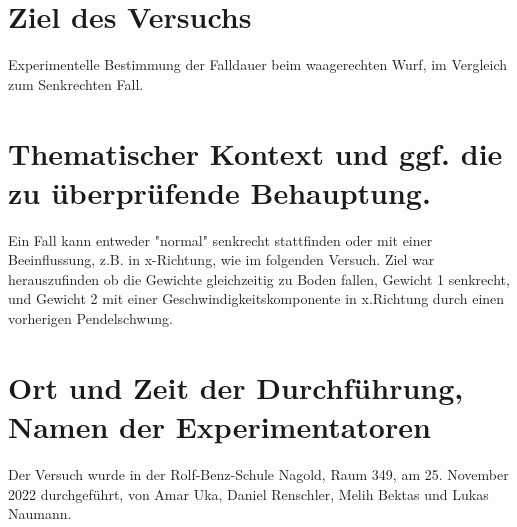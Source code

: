 \documentclass[12p]{article}
\begin{document}
\clearpage

\section*{Ziel des Versuchs}
Experimentelle Bestimmung der Falldauer beim waagerechten Wurf, im Vergleich zum
Senkrechten Fall.

\section*{Thematischer Kontext und ggf. die zu überprüfende Behauptung.}
Ein Fall kann entweder "normal" senkrecht stattfinden oder mit einer
Beeinflussung, z.B. in x-Richtung, wie im folgenden Versuch. Ziel war
herauszufinden ob die Gewichte gleichzeitig zu Boden fallen, Gewicht 1
senkrecht, und Gewicht 2 mit einer Geschwindigkeitskomponente in x.Richtung
durch einen vorherigen Pendelschwung.

\section*{Ort und Zeit der Durchführung, Namen der Experimentatoren}
Der Versuch wurde in der Rolf-Benz-Schule Nagold, Raum 349, am 25. November 2022
durchgeführt, von Amar Uka, Daniel Renschler, Melih Bektas und Lukas Naumann.
\end{document}

